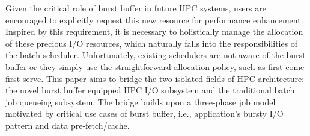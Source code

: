 

Given the critical role of burst buffer in future HPC systems,
users are encouraged to explicitly request this new resource for performance enhancement\cite{apex-workflow}.
Inspired by this requirement, it is necessary to holistically manage
the allocation of these precious I/O resources,
which naturally falls into the responsibilities of the batch scheduler.
Unfortunately, existing schedulers are not aware of the burst buffer\cite{Moab, Cobalt}
or they simply use the straightforward allocation policy, such as first-come first-serve\cite{SlurmBBGuide}.
This paper aims to bridge the two isolated fields of HPC architecture:
the novel burst buffer equipped HPC I/O subsystem and the
traditional batch job queueing subsystem.
The bridge builds upon a three-phase job model motivated by critical use cases of burst buffer,
i.e., application's bursty I/O pattern and data pre-fetch/cache.

